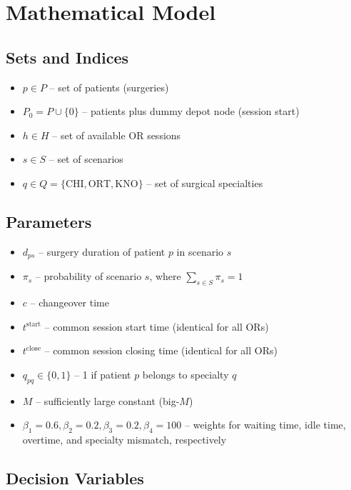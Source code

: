 
\section{Mathematical Model}

\subsection{Sets and Indices}

\begin{itemize}
  \item $p \in P$ -- set of patients (surgeries)
  \item $P_0 = P \cup \{0\}$ -- patients plus dummy depot node (session start)
  \item $h \in H$ -- set of available OR sessions
  \item $s \in S$ -- set of scenarios
  \item $q \in Q = \{\text{CHI},\text{ORT},\text{KNO}\}$ -- set of surgical
        specialties
\end{itemize}

\subsection{Parameters}

\begin{itemize}
  \item $d_{ps}$ -- surgery duration of patient $p$ in scenario $s$
  \item $\pi_s$ -- probability of scenario $s$,
        where $\sum_{s \in S} \pi_s = 1$
  \item $c$ -- changeover time
  \item $t^{\text{start}}$ -- common session start time (identical for all ORs)
  \item $t^{\text{close}}$ -- common session closing time (identical for all
        ORs)
  \item $q_{pq} \in \{0,1\}$ -- 1 if patient $p$ belongs to specialty $q$
  \item $M$ -- sufficiently large constant (big-$M$)
  \item $\beta_1=0.6, \beta_2=0.2, \beta_3=0.2, \beta_4=100$ -- weights for waiting time, idle
        time, overtime, and specialty mismatch, respectively
\end{itemize}

\subsection{Decision Variables}

